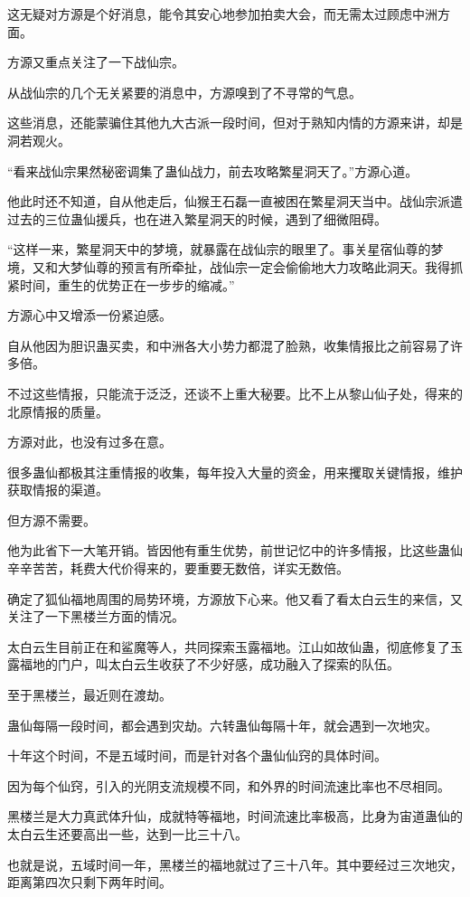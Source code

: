 \begin{this_body}
这无疑对方源是个好消息，能令其安心地参加拍卖大会，而无需太过顾虑中洲方面。

方源又重点关注了一下战仙宗。

从战仙宗的几个无关紧要的消息中，方源嗅到了不寻常的气息。

这些消息，还能蒙骗住其他九大古派一段时间，但对于熟知内情的方源来讲，却是洞若观火。

“看来战仙宗果然秘密调集了蛊仙战力，前去攻略繁星洞天了。”方源心道。

他此时还不知道，自从他走后，仙猴王石磊一直被困在繁星洞天当中。战仙宗派遣过去的三位蛊仙援兵，也在进入繁星洞天的时候，遇到了细微阻碍。

“这样一来，繁星洞天中的梦境，就暴露在战仙宗的眼里了。事关星宿仙尊的梦境，又和大梦仙尊的预言有所牵扯，战仙宗一定会偷偷地大力攻略此洞天。我得抓紧时间，重生的优势正在一步步的缩减。”

方源心中又增添一份紧迫感。

自从他因为胆识蛊买卖，和中洲各大小势力都混了脸熟，收集情报比之前容易了许多倍。

不过这些情报，只能流于泛泛，还谈不上重大秘要。比不上从黎山仙子处，得来的北原情报的质量。

方源对此，也没有过多在意。

很多蛊仙都极其注重情报的收集，每年投入大量的资金，用来攫取关键情报，维护获取情报的渠道。

但方源不需要。

他为此省下一大笔开销。皆因他有重生优势，前世记忆中的许多情报，比这些蛊仙辛辛苦苦，耗费大代价得来的，要重要无数倍，详实无数倍。

确定了狐仙福地周围的局势环境，方源放下心来。他又看了看太白云生的来信，又关注了一下黑楼兰方面的情况。

太白云生目前正在和鲨魔等人，共同探索玉露福地。江山如故仙蛊，彻底修复了玉露福地的门户，叫太白云生收获了不少好感，成功融入了探索的队伍。

至于黑楼兰，最近则在渡劫。

蛊仙每隔一段时间，都会遇到灾劫。六转蛊仙每隔十年，就会遇到一次地灾。

十年这个时间，不是五域时间，而是针对各个蛊仙仙窍的具体时间。

因为每个仙窍，引入的光阴支流规模不同，和外界的时间流速比率也不尽相同。

黑楼兰是大力真武体升仙，成就特等福地，时间流速比率极高，比身为宙道蛊仙的太白云生还要高出一些，达到一比三十八。

也就是说，五域时间一年，黑楼兰的福地就过了三十八年。其中要经过三次地灾，距离第四次只剩下两年时间。


\end{this_body}

